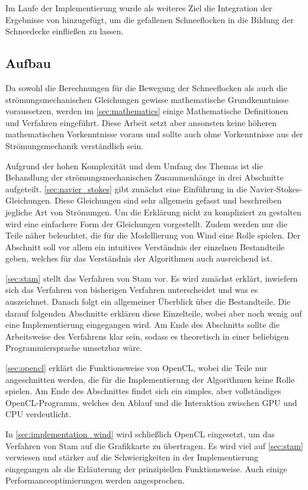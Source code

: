 Im Laufe der Implementierung wurde als weiteres Ziel die Integration
der Ergebnisse von \cite{Schwarz2012} hinzugefügt, um die gefallenen
Schneeflocken in die Bildung der Schneedecke einfließen zu lassen.


\subsection{Aufbau}

Da sowohl die Berechnungen für die Bewegung der Schneeflocken als auch
die strömungsmechanischen Gleichungen gewisse mathematische
Grundkenntnisse voraussetzen, werden im \autoref{sec:mathematics}
einige Mathematische Definitionen und Verfahren eingeführt. Diese
Arbeit setzt aber ansonsten keine höheren mathematischen Vorkenntnisse
voraus und sollte auch ohne Vorkenntnisse aus der Strömungsmechanik
verständlich sein.

Aufgrund der hohen Komplexität und dem Umfang des Themas ist die
Behandlung der strömungsmechanischen Zusammenhänge in drei Abschnitte
aufgeteilt. \autoref{sec:navier_stokes} gibt zunächst eine Einführung
in die Navier-Stokes-Gleichungen. Diese Gleichungen sind sehr
allgemein gefasst und beschreiben jegliche Art von Strömungen. Um die
Erklärung nicht zu kompliziert zu gestalten wird eine einfachere Form
der Gleichungen vorgestellt. Zudem werden nur die Teile näher
beleuchtet, die für die Modellierung von Wind eine Rolle spielen. Der
Abschnitt soll vor allem ein intuitives Verständnis der einzelnen
Bestandteile geben, welches für das Verständnis der Algorithmen auch
ausreichend ist.

\autoref{sec:stam} stellt das Verfahren von Stam vor. Es wird zunächst
erklärt, inwiefern sich das Verfahren von bisherigen Verfahren
unterscheidet und was es auszeichnet. Danach folgt ein allgemeiner
Überblick über die Bestandteile. Die darauf folgenden Abschnitte
erklären diese Einzelteile, wobei aber noch wenig auf eine
Implementierung eingegangen wird. Am Ende des Abschnitts sollte die
Arbeitsweise des Verfahrens klar sein, sodass es theoretisch in einer
beliebigen Programmiersprache umsetzbar wäre.

\autoref{sec:opencl} erklärt die Funktionsweise von OpenCL, wobei die
Teile nur angeschnitten werden, die für die Implementierung der
Algorithmen keine Rolle spielen. Am Ende des Abschnittes findet sich
ein simples, aber vollständiges OpenCL-Programm, welches den Ablauf
und die Interaktion zwischen GPU und CPU verdeutlicht.

In \autoref{sec:implementation_wind} wird schließlich OpenCL
eingesetzt, um das Verfahren von Stam auf die Grafikkarte zu
übertragen. Es wird viel auf \autoref{sec:stam} verwiesen und stärker
auf die Schwierigkeiten in der Implementierung eingegangen als die
Erläuterung der prinzipiellen Funktionsweise. Auch einige
Performanceoptimierungen werden angesprochen.

